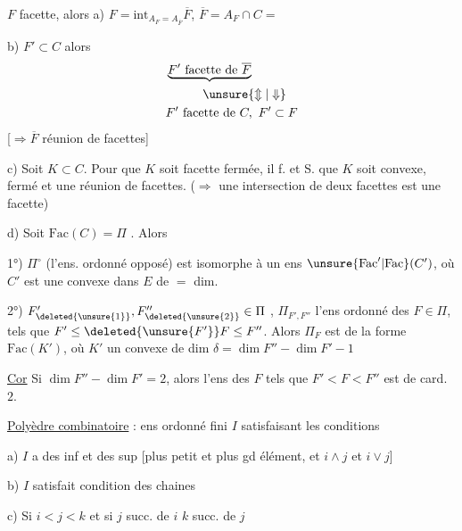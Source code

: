 $F$ facette, alors  a) $F=\mathrm{int}_{A_F=A_{\overline F}}\overline F$, $\overline F=A_F\cap C=$


b) $F'\subset C$ alors
\[
\begin{aligned}
&\underbrace{F'\ \text{facette de }\overline F}\\
&\hspace{3em}\unsure{\Updownarrow|\Downarrow}\\
&F'\ \text{facette de }C,\ F'\subset F
\end{aligned}
\]
[$\Rightarrow\overline F$ réunion de facettes]

c) Soit  $K\subset C$. Pour que $K$ soit  facette
fermée, il f. et S. que $K$ soit convexe, fermé et
une réunion de facettes. ($\Rightarrow$ une intersection
de deux facettes est une facette)

d)  Soit $\mathrm{Fac}(C)=\Pi$ . Alors

1°) $\Pi^\circ$ (l'ens. ordonné opposé) est isomorphe
à un ens $\unsure{\mathrm{Fac}'|\mathrm{Fac}}(C')$, où $C'$ est une
 convexe  dans $E$ de $=$ dim.

2°)  $F'_{\deleted{\unsure{1}}},F''_{\deleted{\unsure{2}}}\in\Pi$ , $\Pi_{F',F''}$ l'ens ordonné des $F\in\Pi$, tels que $F'\leq \deleted{\unsure{F'}}F\leq F''$. Alors $\Pi_F$
est  de la forme  $\mathrm{Fac}(K')$, où
$K'$ un  convexe de dim $\delta=\dim F''-\dim F'-1$

\uline{Cor} Si  $\dim F''-\dim F'=2$, alors  l'ens
des $F$ tels que $F'<F<F''$ est de card. $2$.


\uline{Polyèdre combinatoire} : ens ordonné
fini $I$ satisfaisant les conditions

a) $I$ a des inf et des sup 
[plus petit et plus gd élément, et
$i\wedge j$ et $i\vee j$]

b) $I$ satisfait condition des chaines

c) Si $i<j<$$k$ et si $j$ succ.  de $i$
$k$ succ. de $j$
